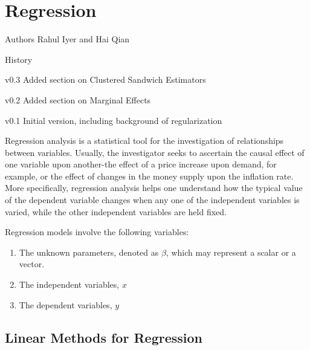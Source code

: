 
\chapter[Regression]{Regression}
\begin{moduleinfo}
\item[Authors] {Rahul Iyer and Hai Qian}
\item[History]
	\begin{modulehistory}
    \item[v0.3] Added section on Clustered Sandwich Estimators
    \item[v0.2] Added section on Marginal Effects
		\item[v0.1] Initial version, including background of regularization
	\end{modulehistory}
\end{moduleinfo}


Regression analysis is a statistical tool for the investigation of
relationships between variables. Usually, the investigator seeks to ascertain
the causal effect of one variable upon another-the effect of a price increase
upon demand, for example, or the effect of changes in the money supply upon the
inflation rate. More specifically, regression analysis helps one understand how
the typical value of the dependent variable changes when any one of the
independent variables is varied, while the other independent variables are held
fixed.

Regression models involve the following variables:
\begin{enumerate}
    \item The unknown parameters, denoted as $\beta$, which may represent a scalar or a vector.
    \item The independent variables, $x$
    \item The dependent variables, $y$
\end{enumerate}

\section{Linear Methods for Regression} %
\label{sub:linear_methods_for_regression}


